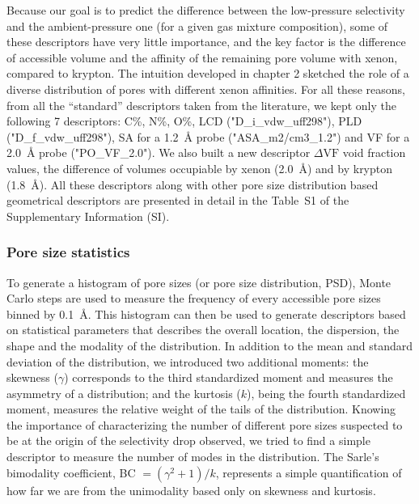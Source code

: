 \documentclass[main]{subfiles}
\begin{document}
Because our goal is to predict the difference between the low-pressure selectivity and the ambient-pressure one (for a given gas mixture composition), some of these descriptors have very little importance, and the key factor is the difference of accessible volume and the affinity of the remaining pore volume with xenon, compared to krypton. The intuition developed in chapter 2 sketched the role of a diverse distribution of pores with different xenon affinities. For all these reasons, from all the ``standard'' descriptors taken from the literature, we kept only the following 7 descriptors: C\%, N\%, O\%, LCD ("D\_i\_vdw\_uff298"), PLD ("D\_f\_vdw\_uff298"), SA for a \SI{1.2}{\angstrom} probe ("ASA\_m2/cm3\_1.2") and VF for a \SI{2.0}{\angstrom} probe ("PO\_VF\_2.0"). We also built a new descriptor $\Delta \text{VF}$ void fraction values, the difference of volumes occupiable by xenon (\SI{2.0}{\angstrom}) and by krypton (\SI{1.8}{\angstrom}). All these descriptors along with other pore size distribution based geometrical descriptors are presented in detail in the Table~S1 of the Supplementary Information (SI).

\subsubsection{Pore size statistics}

To generate a histogram of pore sizes (or pore size distribution, PSD), Monte Carlo steps are used to measure the frequency of every accessible pore sizes binned by \SI{0.1}{\angstrom}.\autocite{poresize_Pinheiro2013} This histogram can then be used to generate descriptors based on statistical parameters that describes the overall location, the dispersion, the shape and the modality of the distribution. In addition to the mean and standard deviation of the distribution, we introduced two additional moments: the skewness ($\gamma$) corresponds to the third standardized moment and measures the asymmetry of a distribution; and the kurtosis ($k$), being the fourth standardized moment, measures the relative weight of the tails of the distribution. Knowing the importance of characterizing the number of different pore sizes suspected to be at the origin of the selectivity drop observed, we tried to find a simple descriptor to measure the number of modes in the distribution. The Sarle's bimodality coefficient, BC $= (\gamma^2 +1)/k$, represents a simple quantification of how far we are from the unimodality based only on skewness and kurtosis.\autocite{Tarba_2022}
\end{document}

